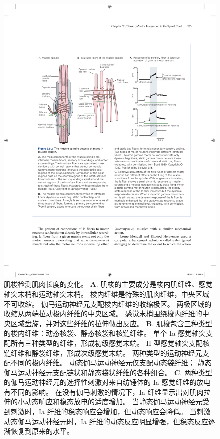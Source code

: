 \begin{figure}[htbp]
	\centering
	\includegraphics[width=0.9\linewidth]{chap32/fig_32_2}
	\caption{肌梭检测肌肉长度的变化。
	\textbf{A}. 肌梭的主要成分是梭内肌纤维、感觉轴突末梢和运动轴突末梢。
	梭内纤维是特殊的肌肉纤维，中央区域不可收缩。 伽马运动神经元支配梭内纤维的收缩极区。
	两极区域的收缩从两端拉动梭内纤维的中央区域。
	感觉末梢围绕梭内纤维的中央区域盘旋，并对这些纤维的拉伸做出反应\cite{hulliger1984mammalian}。
	\textbf{B}. 肌梭包含三种类型的梭内纤维：动态核袋、静态核袋和核链纤维。
	单个 Ia 感觉轴突支配所有三种类型的纤维，形成初级感觉末端。
	II 型感觉轴突支配核链纤维和静袋纤维，形成次级感觉末端。
	两种类型的运动神经元支配不同的梭内纤维。
	动态伽马运动神经元仅支配动态袋纤维；
	静态伽马运动神经元支配链状和静态袋状纤维的各种组合\cite{boyd1980isolated}。
	\textbf{C}. 两种类型的伽马运动神经元的选择性刺激对来自纺锤体的 Ia 感觉纤维的放电有不同的影响。
	在没有伽马刺激的情况下，Ia 纤维显示出对肌肉拉伸的小动态响应和稳态放电的适度增加。
	当静态伽马运动神经元受到刺激时，Ia 纤维的稳态响应会增加，但动态响应会降低。
	当刺激动态伽马运动神经元时，Ia 纤维的动态反应明显增强，但稳态反应逐渐恢复到原来的水平\cite{brown1966subdivision}。}
	\label{fig:32_2}
\end{figure}



